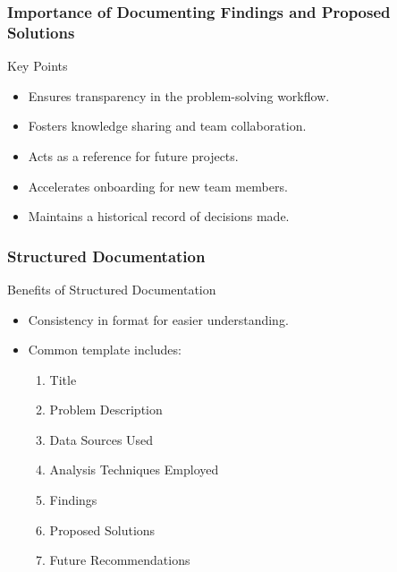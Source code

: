 \documentclass[aspectratio=169]{beamer}
\begin{document}
\begin{frame}[fragile]
    \frametitle{Importance of Documenting Findings and Proposed Solutions}
    \begin{block}{Key Points}
        \begin{itemize}
            \item Ensures transparency in the problem-solving workflow.
            \item Fosters knowledge sharing and team collaboration.
            \item Acts as a reference for future projects.
            \item Accelerates onboarding for new team members.
            \item Maintains a historical record of decisions made.
        \end{itemize}
    \end{block}
\end{frame}

\begin{frame}[fragile]
    \frametitle{Structured Documentation}
    \begin{block}{Benefits of Structured Documentation}
        \begin{itemize}
            \item Consistency in format for easier understanding.
            \item Common template includes:
                \begin{enumerate}
                    \item Title
                    \item Problem Description
                    \item Data Sources Used
                    \item Analysis Techniques Employed
                    \item Findings
                    \item Proposed Solutions
                    \item Future Recommendations
                \end{enumerate}
        \end{itemize}
    \end{block}
\end{frame}
\end{document}
